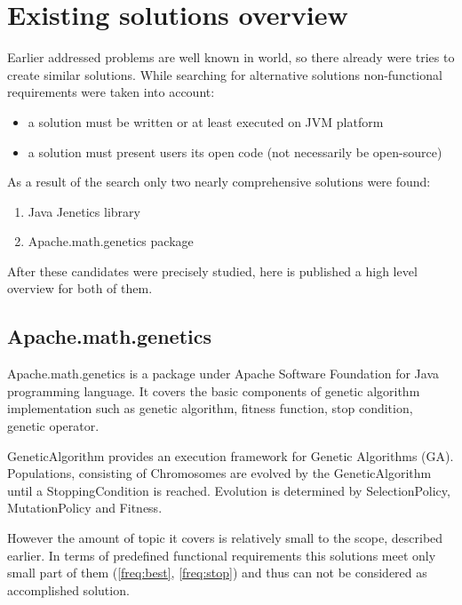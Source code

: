 \chapter{Existing solutions overview}

Earlier addressed problems are well known in world, so there already were tries to create similar solutions. While searching for alternative solutions non-functional requirements were taken into account:
\begin{itemize}

\item a solution must be written or at least executed on JVM platform 

\item a solution must present users its open code (not necessarily be open-source)
\end{itemize}

As a result of the search only two nearly comprehensive solutions were found: 
\begin{enumerate}
\item Java Jenetics library

\item Apache.math.genetics package
\end{enumerate}

After these candidates were precisely studied, here is published a high level overview for both of them.

\section{Apache.math.genetics}

Apache.math.genetics is a package under Apache Software Foundation for Java programming language. It covers the basic components of genetic algorithm implementation such as genetic algorithm, fitness function, stop condition, genetic operator.

GeneticAlgorithm provides an execution framework for Genetic Algorithms (GA). Populations, consisting of Chromosomes are evolved by the GeneticAlgorithm until a StoppingCondition is reached. Evolution is determined by SelectionPolicy, MutationPolicy and Fitness. \cite{apache_genetics}

However the amount of topic it covers is relatively small to the scope, described earlier. In terms of predefined functional requirements this solutions meet only small part of them (\ref{freq:best}, \ref{freq:stop}) and thus can not be considered as accomplished solution.

